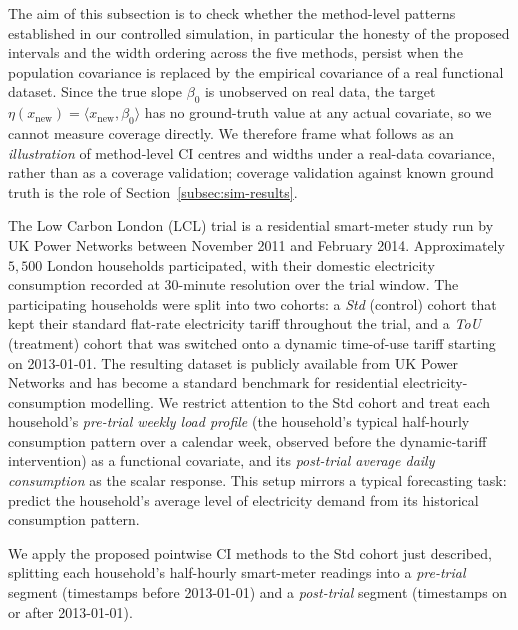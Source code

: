 \documentclass[aos]{imsart}
\theoremstyle{plain}
\theoremstyle{definition}
\theoremstyle{definition}
\begin{document}
The aim of this subsection is to check whether the method-level patterns established in our controlled simulation, in particular the honesty of the proposed intervals and the width ordering across the five methods, persist when the population covariance is replaced by the empirical covariance of a real functional dataset. Since the true slope $\beta_0$ is unobserved on real data, the target $\eta(x_{\text{new}}) = \langle x_{\text{new}}, \beta_0 \rangle$ has no ground-truth value at any actual covariate, so we cannot measure coverage directly. We therefore frame what follows as an \emph{illustration} of method-level CI centres and widths under a real-data covariance, rather than as a coverage validation; coverage validation against known ground truth is the role of Section~\ref{subsec:sim-results}.

The Low Carbon London (LCL) trial is a residential smart-meter study run by UK Power Networks between November 2011 and February 2014. Approximately $5{,}500$ London households participated, with their domestic electricity consumption recorded at $30$-minute resolution over the trial window. The participating households were split into two cohorts: a \emph{Std} (control) cohort that kept their standard flat-rate electricity tariff throughout the trial, and a \emph{ToU} (treatment) cohort that was switched onto a dynamic time-of-use tariff starting on 2013-01-01. The resulting dataset is publicly available from UK Power Networks and has become a standard benchmark for residential electricity-consumption modelling. We restrict attention to the Std cohort and treat each household's \emph{pre-trial weekly load profile} (the household's typical half-hourly consumption pattern over a calendar week, observed before the dynamic-tariff intervention) as a functional covariate, and its \emph{post-trial average daily consumption} as the scalar response. This setup mirrors a typical forecasting task: predict the household's average level of electricity demand from its historical consumption pattern.

We apply the proposed pointwise CI methods to the Std cohort just described, splitting each household's half-hourly smart-meter readings into a \emph{pre-trial} segment (timestamps before 2013-01-01) and a \emph{post-trial} segment (timestamps on or after 2013-01-01).
\end{document}
